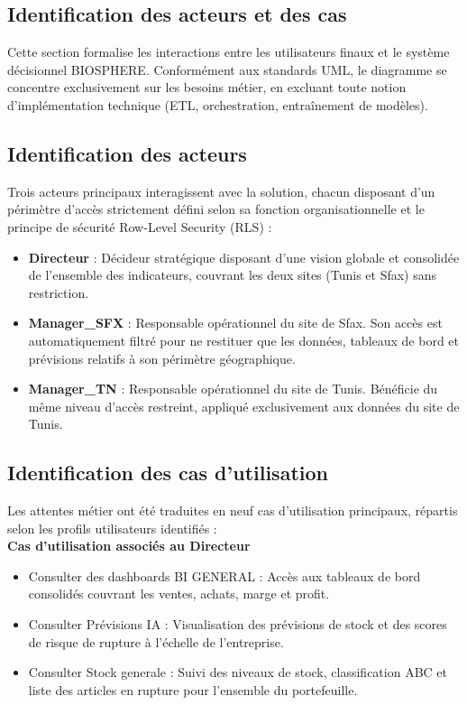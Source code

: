 \subsection{Identification des acteurs et des cas}
Cette section formalise les interactions entre les utilisateurs finaux et le système décisionnel BIOSPHERE. Conformément aux standards UML, le diagramme se concentre exclusivement sur les besoins métier, en excluant toute notion d'implémentation technique (ETL, orchestration, entraînement de modèles).
\subsection{Identification des acteurs}
Trois acteurs principaux interagissent avec la solution, chacun disposant d'un périmètre d'accès strictement défini selon sa fonction organisationnelle et le principe de sécurité Row-Level Security (RLS) :
\begin{itemize}
    \item \textbf{Directeur} : Décideur stratégique disposant d'une vision globale et consolidée de l'ensemble des indicateurs, couvrant les deux sites (Tunis et Sfax) sans restriction.
    \item \textbf{Manager\_SFX }: Responsable opérationnel du site de Sfax. Son accès est automatiquement filtré pour ne restituer que les données, tableaux de bord et prévisions relatifs à son périmètre géographique.
    \item \textbf{Manager\_TN} : Responsable opérationnel du site de Tunis. Bénéficie du même niveau d'accès restreint, appliqué exclusivement aux données du site de Tunis.
\end{itemize}
\subsection{Identification des cas d'utilisation}
Les attentes métier ont été traduites en neuf cas d'utilisation principaux, répartis selon les profils utilisateurs identifiés :\\

\textbf{Cas d'utilisation associés au Directeur }
\begin{itemize}
    \item Consulter des dashboards BI GENERAL : Accès aux tableaux de bord consolidés couvrant les ventes, achats, marge et profit.
    \item Consulter Prévisions IA : Visualisation des prévisions de stock et des scores de risque de rupture à l'échelle de l'entreprise.
    \item Consulter Stock generale : Suivi des niveaux de stock, classification ABC et liste des articles en rupture pour l'ensemble du portefeuille.
\end{itemize}

